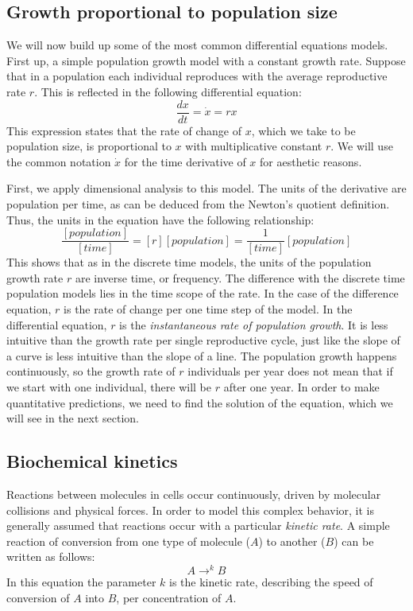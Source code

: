 \documentclass[11pt]{book}
\begin{document}
\subsection{Growth proportional to population size}
We will now build up some of the most common differential equations models. First up, a simple population growth model with a constant growth rate. Suppose that in a population each individual reproduces with the average reproductive rate $r$. This is reflected in the following differential equation:
\begin{equation}
\frac{d x} {dt} = \dot x = r x
\label{eq:linear_ode}
 \end{equation}
This expression states that the rate of change of $x$, which we take to be population size, is proportional to $x$ with multiplicative constant $r$. We will use the common notation $\dot x$ for the time derivative of $x$ for aesthetic reasons.

First, we apply dimensional analysis to this model. The units of the derivative are population per time, as can be deduced from the Newton's quotient definition. Thus, the units in the equation have the following relationship:
$$ \frac{[population]}{[time]} = [r] [population] = \frac{1}{[time]}[population] $$
This shows that as in the discrete time models, the units of the population growth rate $r$ are inverse time, or frequency. The difference with the discrete time population models lies in the time scope of the rate. In the case of the difference equation, $r$ is the rate of change per one time step of the model. In the differential equation, $r$ is the \emph{instantaneous rate of population growth}. It is less intuitive than the growth rate per single reproductive cycle, just like the slope of a curve is less intuitive than the slope of a line. The population growth happens continuously, so the growth rate of $r$ individuals per year does not mean that if we start with one individual, there will be $r$ after one year. In order to make quantitative predictions, we need to find the solution of the equation, which we will see in the next section.

\subsection{Biochemical kinetics}
Reactions between molecules in cells occur continuously, driven by molecular collisions and physical forces. In order to model this complex behavior, it is generally assumed that reactions occur with a particular \emph{kinetic rate}. A simple reaction of conversion from one type of molecule ($A$) to another ($B$) can be written as follows:
$$ A \rightarrow^k B $$
In this equation the parameter $k$ is the kinetic rate, describing the speed of conversion of $A$ into $B$, per concentration of $A$.
\end{document}
